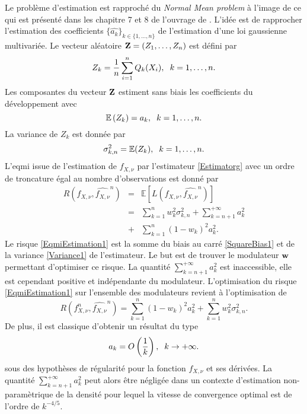 Le problème d'estimation est rapproché du \textit{Normal Mean problem} à l'image de ce qui est présenté dans les chapitre 7 et 8 de l'ouvrage de \citet{Wa06}. L'idée est de rapprocher l'estimation des coefficients $\{\widehat{a_{k}}\}_{k\in\{1,\ldots,n\}}$ de l'estimation d'une loi gaussienne multivariée. Le vecteur aléatoire $\bold{Z}=(Z_{1},\ldots,Z_{n})$ est défini par 
\begin{equation}\label{ZDefinition}
Z_{k}=\frac{1}{n}\sum_{i=1}^{n}Q_{k}(X_{i}),\hspace{0.2cm}k=1,\ldots,n.
\end{equation}
Les composantes du vecteur $\bold{Z}$ estiment sans biais les coefficients du développement avec
\begin{equation}
\mathbb{E}\left(Z_{k}\right)=a_{k},\hspace{0.2cm}k=1,\ldots,n.
\end{equation}
La variance de $Z_{k}$ est donnée par
\begin{equation} 
\sigma_{k,n}^{2}=\mathbb{E}(Z_{k}),\hspace{0.2cm}k=1,\ldots,n.
\end{equation}
L\rq{}\gls{eqmi} issue de l'estimation de $f_{X,\nu}$ par l'estimateur \eqref{Estimatorg} avec un ordre de troncature égal au nombre d\rq{}observations est donné par
\begin{eqnarray}
R\left(f_{X,\nu},\widehat{f_{X,\nu}}^{n} \right)&=&\mathbb{E}\left[L\left(f_{X,\nu},\widehat{f_{X,\nu}}^{n}\right)\right]\label{EqmiEstimation1}\\
&=&\sum_{k=1}^{n}w_{k}^{2}\sigma_{k,n}^{2}+\sum_{k=n+1}^{+\infty}a_{k}^{2}\label{SquareBias1}\\
&+&\sum_{k=1}^{n}(1-w_{k})^{2}a_{k}^{2}\label{Variance1}. 
\end{eqnarray} 
Le risque \eqref{EqmiEstimation1} est la somme du biais au carré \eqref{SquareBias1} et de la variance \eqref{Variance1} de l'estimateur. Le but est de trouver le modulateur $\bold{w}$ permettant d\rq{}optimiser ce risque. La quantité $\sum_{k=n+1}^{+\infty}a_{k}^{2}$ est inaccessible, elle est cependant positive et indépendante du modulateur. L'optimisation du risque \eqref{EqmiEstimation1} sur l'ensemble des modulateurs revient à l'optimisation de
\begin{equation}\label{ModifiedRisk}
R\left(f_{X,\nu}^{n},\widehat{f_{X,\nu}}^{n} \right)=\sum_{k=1}^{n}(1-w_{k})^{2}a_{k}^{2}+\sum_{k=1}^{n}w_{k}^{2}\sigma_{k,n}^{2}.
\end{equation}
De plus, il est classique d'obtenir un résultat du type 
\begin{equation*}
a_{k}=O\left(\frac{1}{k}\right),\hspace{0.2cm}k\rightarrow+\infty.
\end{equation*}
sous des hypothèses de régularité pour la fonction $f_{X,\nu}$ et ses dérivées. La quantité $\sum_{k=n+1}^{+\infty}a_{k}^{2}$ peut alors être négligée dans un contexte d'estimation non-paramètrique de la densité pour lequel la vitesse de convergence optimal est de l'ordre de $k^{-4/5}$. 

